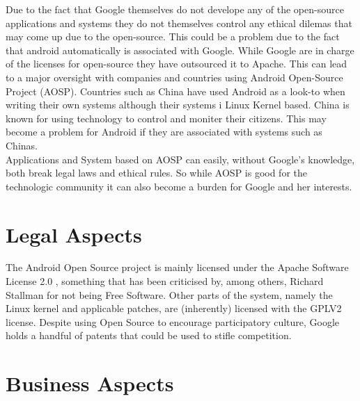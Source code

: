 \documentclass[conference]{IEEEtran}
\begin{document}
{Due to the fact that Google themselves do not develope any of the open-source applications and systems they do not themselves control any ethical dilemas that may come up due to the open-source. This could be a problem due to the fact that android automatically is associated with Google. While Google are in charge of the licenses for open-source they have outsourced it to Apache.\cite{android-licenses} This can lead to a major oversight with companies and countries using Android Open-Source Project (AOSP). Countries such as China have used Android as a look-to when writing their own systems \cite{country-license} although their systems i Linux Kernel based. China is known for using technology to control and moniter their citizens. This may become a problem for Android if they are associated with systems such as Chinas.\\
Applications and System based on AOSP can easily, without Google's knowledge, both break legal laws and ethical rules. So while AOSP is good for the technologic community it can also become a burden for Google and her interests.   }


\section{Legal Aspects}
\label{legal}

{The Android Open Source project is mainly licensed under the Apache Software License 2.0 \cite{apache-license}, something that has been criticised by, among others, Richard Stallman for not being Free Software\cite{rms-android}. Other parts of the system, namely the Linux kernel and applicable patches, are (inherently) licensed with the GPLV2 license\cite{gplv2}\cite{android-licenses}. Despite using Open Source to encourage participatory culture, Google holds a handful of patents that could be used to stifle competition\cite{google-slide-unlock}\cite{google-radial-menu}}.

\section{Business Aspects}
\label{financial}
\end{document}
